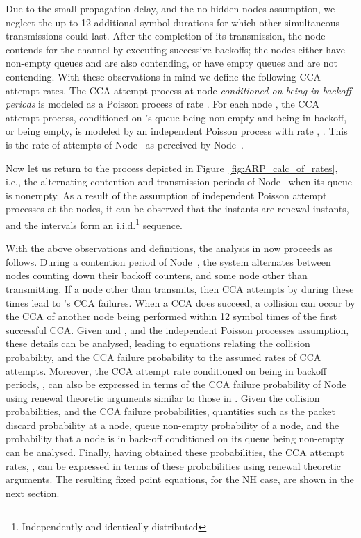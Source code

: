 \documentclass[12pt, draftclsnofoot, onecolumn]{IEEEtran}
\begin{document}
Due to the small propagation delay, and the no hidden nodes assumption, we neglect the up to 12 additional symbol durations for which other simultaneous transmissions could last. After the completion of its transmission, the node  contends for the channel by executing successive backoffs; the nodes  either have non-empty queues and are also contending, or have empty queues and are not contending. With these observations in mind we define the following CCA attempt rates. The CCA attempt process at node  \emph{conditioned on being in backoff periods} is modeled as a Poisson process of rate . For each node , the CCA attempt process, conditioned on 's queue being non-empty and being in backoff, or being empty, is modeled by an independent Poisson process with rate , . This is the rate of attempts of Node~ as perceived by Node~.  

Now let us return to the process depicted in Figure~\ref{fig:ARP_calc_of_rates}, i.e., the alternating contention and transmission periods of Node~ when its queue is nonempty. As a result of the assumption of independent Poisson attempt processes at the nodes, it can be observed that the instants  are renewal instants, and the intervals  form an
i.i.d.\footnote{Independently and identically distributed} sequence. 

With the above observations and definitions, the analysis in \cite{srivastava} now proceeds as follows. During a contention period of Node~, the system alternates between nodes counting down their backoff counters, and some node other than  transmitting. If a node other than  transmits, then CCA attempts by  during these times lead to 's CCA failures. When a CCA does succeed, a collision can occur by the CCA of another node being performed within 12 symbol times of the first successful CCA. Given  and , and the independent Poisson processes assumption, these details can be analysed, leading to equations relating the collision probability, and the CCA failure probability to the assumed rates of CCA attempts. Moreover, the CCA attempt rate conditioned on being in backoff periods, , can also be expressed in terms of the CCA failure probability of Node~ using renewal theoretic arguments similar to those in \cite{kumar-etal04new-insights}. Given the collision probabilities, and the CCA failure probabilities, quantities such as the packet discard probability at a node, queue non-empty probability of a node, and the probability that a node is in back-off conditioned on its queue being non-empty can be analysed. Finally, having obtained these probabilities, the CCA attempt rates, , can be expressed in terms of these probabilities using renewal theoretic arguments. The resulting fixed point equations, for the NH case, are shown in the next section.
\end{document}
